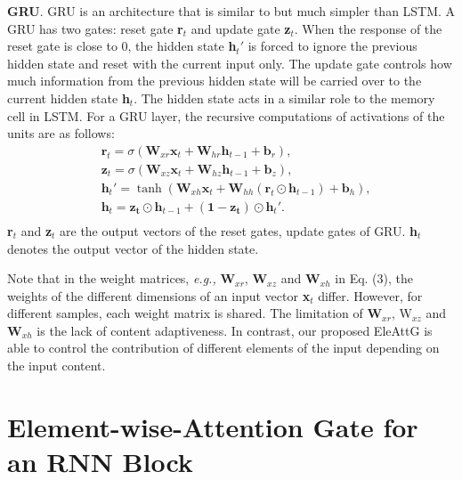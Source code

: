 \documentclass[journal]{IEEEtran}
\newcommand{\Outer}{Element-wise}
\begin{document}
\textbf{GRU}. GRU is an architecture that is similar to but much simpler than LSTM. A GRU has two gates: reset gate \textbf{r$_t$} and update gate \textbf{z$_t$}. When the response of the reset gate is close to 0, the hidden state \textbf{h$_t'$} is forced to ignore the previous hidden state and reset with the current input only. The update gate controls how much information from the previous hidden state will be carried over to the current hidden state \textbf{h$_t$}. The hidden state acts in a similar role to the memory cell in LSTM. For a GRU layer, the recursive computations of activations of the units are as follows:
\begin{equation}
\label{equ:gru}
\begin{aligned}
\!&\mathbf{r}_t = \sigma \left( {\mathbf{W}}_{xr} \mathbf{x}_t + {\mathbf{W}}_{hr} \mathbf{h}_{t-1} + \mathbf{b}_r \right),\\
\!&\mathbf{z}_t = \sigma \left( {\mathbf{W}}_{xz} \mathbf{x}_t + {\mathbf{W}}_{hz} \mathbf{h}_{t-1} + \mathbf{b}_z \right),\\
\!&\mathbf{h}_t' = \tanh \left( {\mathbf{W}}_{xh} \mathbf{x}_t + {\mathbf{W}}_{hh} (\mathbf{r}_t \odot \mathbf{h}_{t-1}) + \mathbf{b}_h \right),\\
\!&\mathbf{h}_t =  {\mathbf{z_t}} \odot {\mathbf{h}_{t-1}}  + ({\mathbf{1 - z_t}}) \odot {\mathbf{h}_t'}.\\
\end{aligned}
\end{equation}
\textbf{r$_t$} and \textbf{z$_t$} are the output vectors of the reset gates, update gates of GRU. \textbf{h$_t$} denotes the output vector of the hidden state.

Note that in the weight matrices, {\it{e.g.},} \textbf{W$_{xr}$}, \textbf{W$_{xz}$} and\textbf{ W$_{xh}$} in Eq. (3),  the weights of the different dimensions of an input vector\textbf{ x$_t$} differ. However, for different samples, each weight matrix is shared.  The limitation of \textbf{W$_{xr}$}, W$_{xz}$ and \textbf{W$_{xh}$} is the lack of content adaptiveness. In contrast, our proposed EleAttG is able to control the contribution of different elements of the input depending on the input content.

\section{\Outer-Attention Gate for an RNN Block}
\label{sec:EleAtt-RNN}
\end{document}
